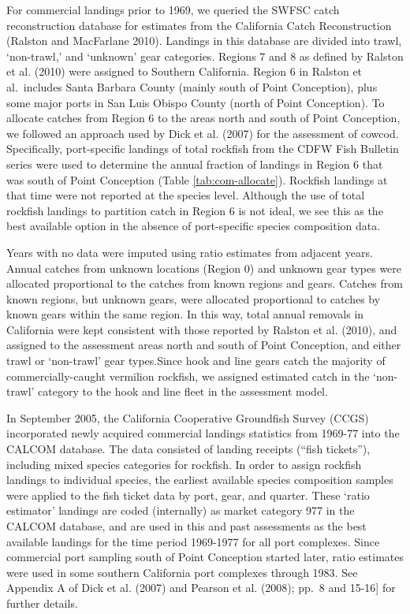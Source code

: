 \documentclass[
  english,
  a4paper,
]{article}
\begin{document}
For commercial landings prior to 1969, we queried the SWFSC catch reconstruction
database for estimates from the California Catch Reconstruction (Ralston and MacFarlane 2010).
Landings in this database are divided into trawl, `non-trawl,' and `unknown' gear
categories. Regions 7 and 8 as defined by Ralston et al. (2010) were
assigned to Southern California. Region 6 in Ralston et al.~includes Santa
Barbara County (mainly south of Point Conception), plus some major ports in San
Luis Obispo County (north of Point Conception). To allocate catches from Region
6 to the areas north and south of Point Conception, we followed an approach used
by Dick et al. (2007) for the assessment of cowcod. Specifically,
port-specific landings of total rockfish from the CDFW Fish Bulletin series were
used to determine the annual fraction of landings in Region 6 that was south of
Point Conception (Table \ref{tab:com-allocate}). Rockfish landings at that time were not reported
at the species level. Although the use of total rockfish landings to partition
catch in Region 6 is not ideal, we see this as the best available option in the
absence of port-specific species composition data.

Years with no data were imputed
using ratio estimates from adjacent years. Annual catches from unknown locations
(Region 0) and unknown gear types were allocated proportional to the catches from
known regions and gears. Catches from known regions, but unknown gears, were
allocated proportional to catches by known gears within the same region. In this way,
total annual removals in California were kept consistent with those reported by
Ralston et al. (2010), and assigned to the assessment areas north and
south of Point Conception, and either trawl or `non-trawl' gear types.Since hook and line gears catch the majority of
commercially-caught vermilion rockfish, we assigned estimated catch in the
`non-trawl' category to the hook and line fleet in the assessment model.

In September 2005, the California Cooperative Groundfish Survey (CCGS)
incorporated newly acquired commercial landings statistics from 1969-77 into
the CALCOM database. The data consisted of landing receipts (``fish tickets''),
including mixed species categories for rockfish. In order to assign rockfish
landings to individual species, the earliest available species composition
samples were applied to the fish ticket data by port, gear, and quarter. These
`ratio estimator' landings are coded (internally) as market category 977 in the
CALCOM database, and are used in this and past assessments as the best available
landings for the time period 1969-1977 for all port complexes. Since commercial
port sampling south of Point Conception started later, ratio estimates were used
in some southern California port complexes through 1983. See Appendix A of Dick
et al. (2007) and Pearson et al. (2008); pp.~8 and 15-16{]} for
further details.
\end{document}
